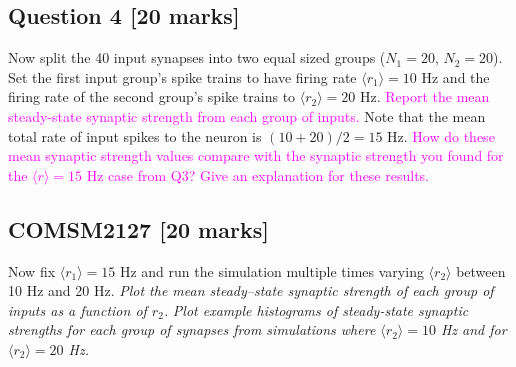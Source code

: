 \documentclass[12pt]{article}
\begin{document}
\subsection*{Question 4 [20 marks]} Now split the 40 input synapses into two equal sized groups ($N_{1}=20$, $N_{2}=20$). Set the first input group's spike trains to have firing rate $\langle r_1\rangle  = 10$ Hz and the firing rate of the second group's spike trains to $\langle r_2\rangle =20$ Hz. \textcolor{magenta}{Report the mean steady-state synaptic strength from each group of inputs.} Note that the mean total rate of input spikes to the neuron is $(10+20)/2 = 15$ Hz. \textcolor{magenta}{How do these mean synaptic strength values compare with the synaptic strength you found for the $\langle r\rangle=15$ Hz case from Q3? Give an explanation for these results.}


\subsection*{COMSM2127 [20 marks]} Now fix $\langle r_1\rangle =15$ Hz and run the simulation multiple times varying $\langle r_2\rangle$ between 10 Hz and 20 Hz. \emph{Plot the mean steady--state synaptic strength of each group of inputs as a function of $r_2$.} \emph{Plot example histograms of steady-state synaptic strengths for each group of synapses from simulations where $\langle r_2\rangle=10$ Hz and for $\langle r_2\rangle=20$ Hz.}
\end{document}
